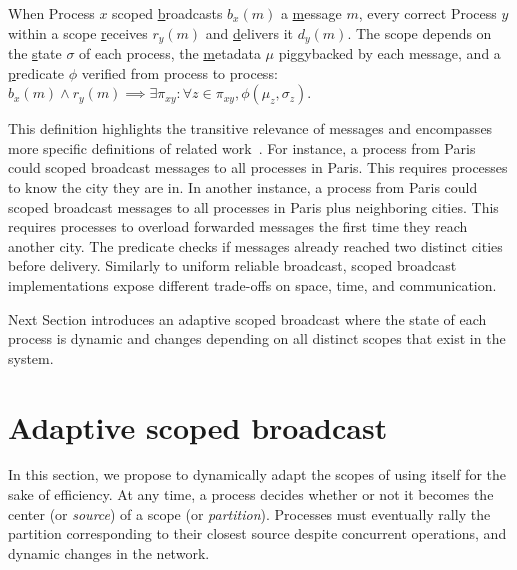 \begin{definition}
  When Process $x$ scoped \underline{b}roadcasts $b_x(m)$ a
  \underline{m}essage $m$, every correct Process $y$ within a scope
  \underline{r}eceives $r_y(m)$ and \underline{d}elivers it
  $d_y(m)$. The scope depends on the \underline{s}tate $\sigma$ of
  each process, the \underline{m}etadata $\mu$ piggybacked by each
  message, and a \underline{p}redicate $\phi$ verified from process to
  process: $b_x(m) \wedge r_y(m) \implies \exists \pi_{xy}: \forall z
  \in \pi_{xy}, \phi(\mu_z, \sigma_z)$.
\end{definition}

This definition highlights the transitive relevance of messages and
encompasses more specific definitions of related
work~\cite{hsiao2005scoped, lue2006scoped, wang2015prodiluvian}. For
instance, a process from Paris could scoped broadcast messages to all
processes in Paris. This requires processes to know the city they are
in. In another instance, a process from Paris could scoped broadcast
messages to all processes in Paris plus neighboring cities. This
requires processes to overload forwarded messages the first time they
reach another city. The predicate checks if messages already reached
two distinct cities before delivery. Similarly to uniform reliable
broadcast, scoped broadcast implementations expose different
trade-offs on space, time, and communication.

Next Section introduces an adaptive scoped broadcast where the state
of each process is dynamic and changes depending on all distinct
scopes that exist in the system.



\section{Adaptive scoped broadcast}
\label{sec:adaptive}

In this section, we propose to dynamically adapt the scopes of \NAMEB
using \NAMEB itself for the sake of efficiency. At any time, a process
decides whether or not it becomes the center (or \emph{source}) of a
scope (or \emph{partition}). Processes must eventually rally the
partition corresponding to their closest source despite concurrent
operations, and dynamic changes in the network.

